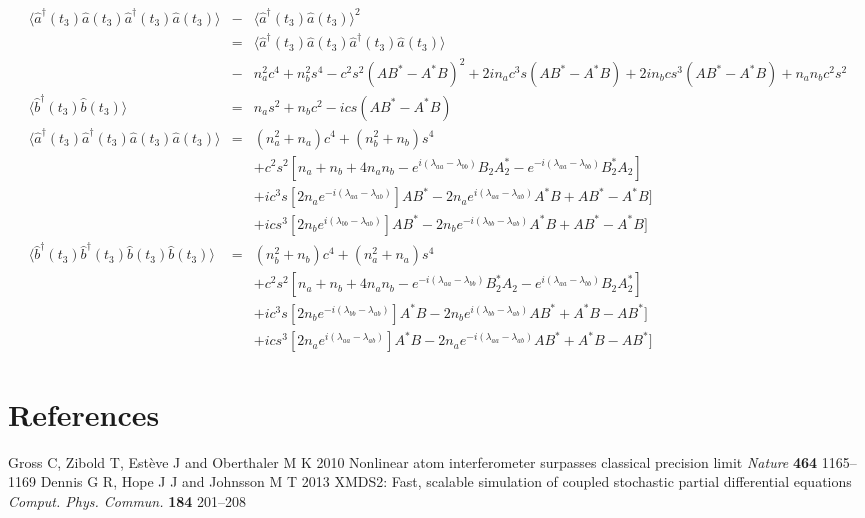 \documentclass[12pt]{iopart}
\begin{document}
\begin{eqnarray}
\langle \hat{a}^{\dagger}(t_3) \hat{a}(t_3) \hat{a}^{\dagger}(t_3)  \hat{a}(t_3) \rangle &-& \langle \hat{a}^{\dagger}(t_3) \hat{a}(t_3) \rangle^2 \nonumber \\
%
&=& \langle \hat{a}^{\dagger}(t_3) \hat{a}(t_3) \hat{a}^{\dagger}(t_3)  \hat{a}(t_3) \rangle \\
&-& n_a^2 c^4 + n_b^2 s^4 - c^2 s^2 (A B^* - A^* B)^2 + 2 i n_a c^3 s (A B^* - A^* B) + 2 i n_b c s^3 (A B^* - A^* B) + n_a n_b c^2 s^2 \\
%
\langle \hat{b}^{\dagger}(t_3) \hat{b}(t_3) \rangle &=& n_a s^2 + n_b c^2 - i c s (A B^* - A^* B) \\
%
\langle \hat{a}^{\dagger}(t_3)  \hat{a}^{\dagger}(t_3) \hat{a}(t_3) \hat{a}(t_3) \rangle &=& (n_a^2 + n_a) c^4 + (n_b^2 + n_b) s^4 \nonumber \\
&& + c^2 s^2 [n_a +n_b +4 n_a n_b - e^{i(\lambda_{aa}-\lambda_{bb})} B_2 A_2^* - e^{-i(\lambda_{aa}-\lambda_{bb})} B_2^* A_2] \nonumber \\
&& + i c^3 s [2 n_a e^{-i(\lambda_{aa}-\lambda_{ab})}] A B^* - 2 n_a e^{i(\lambda_{aa}-\lambda_{ab})} A^* B + A B^* - A^* B] \nonumber \\
&& + i c s^3 [2 n_b e^{i(\lambda_{bb}-\lambda_{ab})}] A B^* - 2 n_b e^{-i(\lambda_{bb}-\lambda_{ab})} A^* B + A B^* - A^* B] \\
%
\langle \hat{b}^{\dagger}(t_3)  \hat{b}^{\dagger}(t_3) \hat{b}(t_3) \hat{b}(t_3) \rangle &=& (n_b^2 + n_b) c^4 + (n_a^2 + n_a) s^4 \nonumber \\
&& + c^2 s^2 [n_a +n_b +4 n_a n_b - e^{-i(\lambda_{aa}-\lambda_{bb})} B_2^* A_2 - e^{i(\lambda_{aa}-\lambda_{bb})} B_2 A_2^*] \nonumber \\
&& + i c^3 s [2 n_b e^{-i(\lambda_{bb}-\lambda_{ab})}] A^* B - 2 n_b e^{i(\lambda_{bb}-\lambda_{ab})} A B^* + A^* B - A B^*] \nonumber \\
&& + i c s^3 [2 n_a e^{i(\lambda_{aa}-\lambda_{ab})}] A^* B - 2 n_a e^{-i(\lambda_{aa}-\lambda_{ab})} A B^* + A^* B - A B^*] 
\end{eqnarray}


\section*{References}
\begin{thebibliography}{10}
 Gross C, Zibold T, Est{\`{e}}ve J and Oberthaler M K 2010 Nonlinear atom interferometer surpasses classical
precision limit {\it Nature} {\bf 464} 1165--1169
 Dennis G R, Hope J J and Johnsson M T 2013 XMDS2: Fast, scalable simulation of coupled stochastic partial
differential equations {\it Comput. Phys. Commun.} {\bf 184} 201--208

\end{thebibliography}
\end{document}
